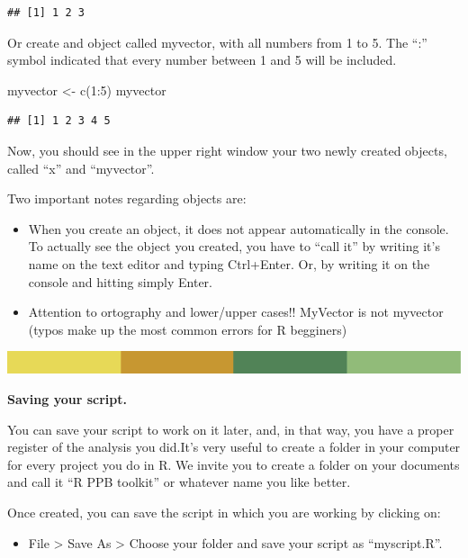 \documentclass[
]{book}
\newenvironment{Shaded}{\begin{snugshade}}{\end{snugshade}}
\newcommand{\DecValTok}[1]{\textcolor[rgb]{0.00,0.00,0.81}{#1}}
\newcommand{\FunctionTok}[1]{\textcolor[rgb]{0.00,0.00,0.00}{#1}}
\newcommand{\NormalTok}[1]{#1}
\newcommand{\OtherTok}[1]{\textcolor[rgb]{0.56,0.35,0.01}{#1}}
\newcommand{\SpecialCharTok}[1]{\textcolor[rgb]{0.00,0.00,0.00}{#1}}
\providecommand{\tightlist}{%
  \setlength{\itemsep}{0pt}\setlength{\parskip}{0pt}}
\begin{document}
\begin{verbatim}
## [1] 1 2 3
\end{verbatim}

Or create and object called myvector, with all numbers from 1 to 5. The ``:'' symbol indicated that every number between 1 and 5 will be included.

\begin{Shaded}
\begin{Highlighting}[]
\NormalTok{myvector }\OtherTok{\textless{}{-}} \FunctionTok{c}\NormalTok{(}\DecValTok{1}\SpecialCharTok{:}\DecValTok{5}\NormalTok{)}
\NormalTok{myvector}
\end{Highlighting}
\end{Shaded}

\begin{verbatim}
## [1] 1 2 3 4 5
\end{verbatim}

Now, you should see in the upper right window your two newly created objects, called ``x'' and ``myvector''.

Two important notes regarding objects are:

\begin{itemize}
\item
  When you create an object, it does not appear automatically in the console. To actually see the object you created, you have to ``call it'' by writing it's name on the text editor and typing Ctrl+Enter. Or, by writing it on the console and hitting simply Enter.
\item
  Attention to ortography and lower/upper cases!! MyVector is not myvector (typos make up the most common errors for R begginers)
\end{itemize}

\includegraphics{rsrstrip.png}

\textbf{Saving your script.}

You can save your script to work on it later, and, in that way, you have a proper register of the analysis you did.It's very useful to create a folder in your computer for every project you do in R. We invite you to create a folder on your documents and call it ``R PPB toolkit'' or whatever name you like better.

Once created, you can save the script in which you are working by clicking on:

\begin{itemize}
\tightlist
\item
  File \textgreater{} Save As \textgreater{} Choose your folder and save your script as ``myscript.R''.
\end{itemize}
\end{document}
